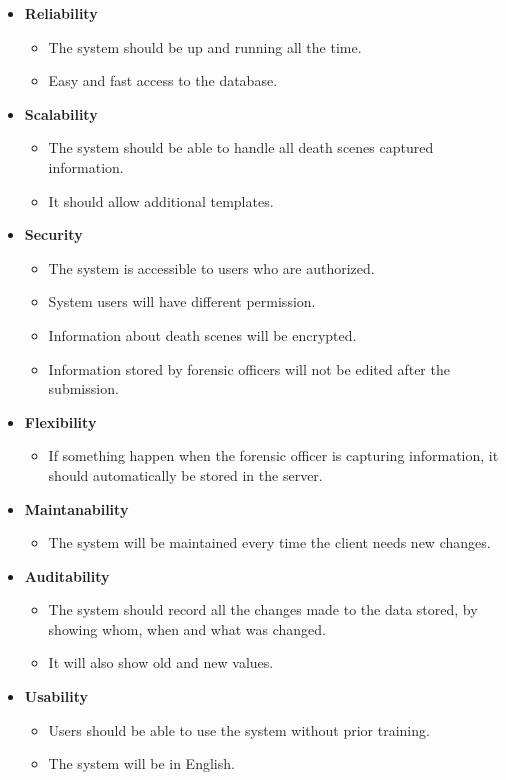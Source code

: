 \documentclass[10pt,a4paper]{article}
\begin{document}
\begin{itemize}
\item\textbf{Reliability}
  \begin{itemize}
  	\item The system should be up and running all the time.
  	\item Easy and fast access to the database.
  \end{itemize}
\item\textbf{Scalability}
\begin{itemize}
  	\item The system should be able to handle all death scenes captured information.
  	\item It should allow additional templates.
  \end{itemize}
\item\textbf{Security}
\begin{itemize}
  	\item The system is accessible to users who are authorized.
  	\item System users will have different permission.
  	\item Information about death scenes will be encrypted.
  	\item Information stored by forensic officers will not be edited after the submission.
  \end{itemize}
\item\textbf{Flexibility} 
\begin{itemize}
  	\item If something happen when the forensic officer is capturing information, it should automatically be stored in the server.
  \end{itemize}
\item\textbf{Maintanability}					
 \begin{itemize}
   	\item The system will be maintained every time the client needs new changes.
   \end{itemize}        
\item\textbf{Auditability}         
      \begin{itemize}
        	\item The system should record all the changes made to the data stored, by showing whom, when and what was changed.
        	\item It will also show old and new values.
        	
        \end{itemize} 
\item\textbf{Usability}
\begin{itemize}
     \item Users should be able to use the system without prior
      training.                                                       \item The system will be in English.   
 \end{itemize}
 
\end{itemize}
\end{document}
